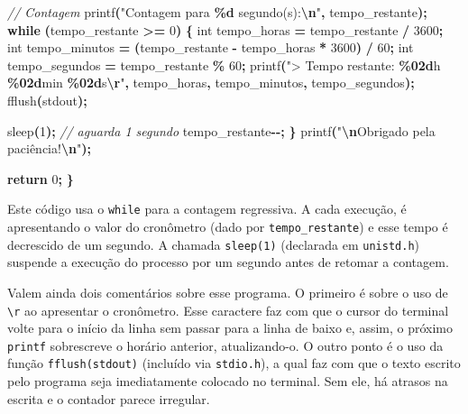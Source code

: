 \documentclass[
  11pt,
  a4paper,
]{scrbook}
\newenvironment{Shaded}{\begin{snugshade}}{\end{snugshade}}
\newcommand{\CommentTok}[1]{\textcolor[rgb]{0.56,0.35,0.01}{\textit{#1}}}
\newcommand{\ControlFlowTok}[1]{\textcolor[rgb]{0.13,0.29,0.53}{\textbf{#1}}}
\newcommand{\DataTypeTok}[1]{\textcolor[rgb]{0.13,0.29,0.53}{#1}}
\newcommand{\DecValTok}[1]{\textcolor[rgb]{0.00,0.00,0.81}{#1}}
\newcommand{\NormalTok}[1]{#1}
\newcommand{\OperatorTok}[1]{\textcolor[rgb]{0.81,0.36,0.00}{\textbf{#1}}}
\newcommand{\SpecialCharTok}[1]{\textcolor[rgb]{0.81,0.36,0.00}{\textbf{#1}}}
\newcommand{\StringTok}[1]{\textcolor[rgb]{0.31,0.60,0.02}{#1}}
\begin{document}
\begin{Shaded}
\begin{Highlighting}[]
    \CommentTok{// Contagem}
\NormalTok{    printf}\OperatorTok{(}\StringTok{"Contagem para }\SpecialCharTok{\%d}\StringTok{ segundo(s):}\SpecialCharTok{\textbackslash{}n}\StringTok{"}\OperatorTok{,}\NormalTok{ tempo\_restante}\OperatorTok{);}
    \ControlFlowTok{while} \OperatorTok{(}\NormalTok{tempo\_restante }\OperatorTok{\textgreater{}=} \DecValTok{0}\OperatorTok{)} \OperatorTok{\{}
        \DataTypeTok{int}\NormalTok{ tempo\_horas }\OperatorTok{=}\NormalTok{ tempo\_restante }\OperatorTok{/} \DecValTok{3600}\OperatorTok{;}
        \DataTypeTok{int}\NormalTok{ tempo\_minutos }\OperatorTok{=} \OperatorTok{(}\NormalTok{tempo\_restante }\OperatorTok{{-}}\NormalTok{ tempo\_horas }\OperatorTok{*} \DecValTok{3600}\OperatorTok{)} \OperatorTok{/} \DecValTok{60}\OperatorTok{;}
        \DataTypeTok{int}\NormalTok{ tempo\_segundos }\OperatorTok{=}\NormalTok{ tempo\_restante }\OperatorTok{\%} \DecValTok{60}\OperatorTok{;}
\NormalTok{        printf}\OperatorTok{(}\StringTok{"\textgreater{} Tempo restante: }\SpecialCharTok{\%02d}\StringTok{h }\SpecialCharTok{\%02d}\StringTok{min }\SpecialCharTok{\%02d}\StringTok{s}\SpecialCharTok{\textbackslash{}r}\StringTok{"}\OperatorTok{,}\NormalTok{ tempo\_horas}\OperatorTok{,}
\NormalTok{               tempo\_minutos}\OperatorTok{,}\NormalTok{ tempo\_segundos}\OperatorTok{);}
\NormalTok{        fflush}\OperatorTok{(}\NormalTok{stdout}\OperatorTok{);}

\NormalTok{        sleep}\OperatorTok{(}\DecValTok{1}\OperatorTok{);}  \CommentTok{// aguarda 1 segundo}
\NormalTok{        tempo\_restante}\OperatorTok{{-}{-};}
    \OperatorTok{\}}
\NormalTok{    printf}\OperatorTok{(}\StringTok{"}\SpecialCharTok{\textbackslash{}n}\StringTok{Obrigado pela paciência!}\SpecialCharTok{\textbackslash{}n}\StringTok{"}\OperatorTok{);}

    \ControlFlowTok{return} \DecValTok{0}\OperatorTok{;}
\OperatorTok{\}}
\end{Highlighting}
\end{Shaded}

Este código usa o \texttt{while} para a contagem regressiva. A cada
execução, é apresentando o valor do cronômetro (dado por
\texttt{tempo\_restante}) e esse tempo é decrescido de um segundo. A
chamada \texttt{sleep(1)} (declarada em \texttt{unistd.h}) suspende a
execução do processo por um segundo antes de retomar a contagem.

Valem ainda dois comentários sobre esse programa. O primeiro é sobre o
uso de \texttt{\textbackslash{}r} ao apresentar o cronômetro. Esse
caractere faz com que o cursor do terminal volte para o início da linha
sem passar para a linha de baixo e, assim, o próximo \texttt{printf}
sobrescreve o horário anterior, atualizando-o. O outro ponto é o uso da
função \texttt{fflush(stdout)} (incluído via \texttt{stdio.h}), a qual
faz com que o texto escrito pelo programa seja imediatamente colocado no
terminal. Sem ele, há atrasos na escrita e o contador parece irregular.
\end{document}
